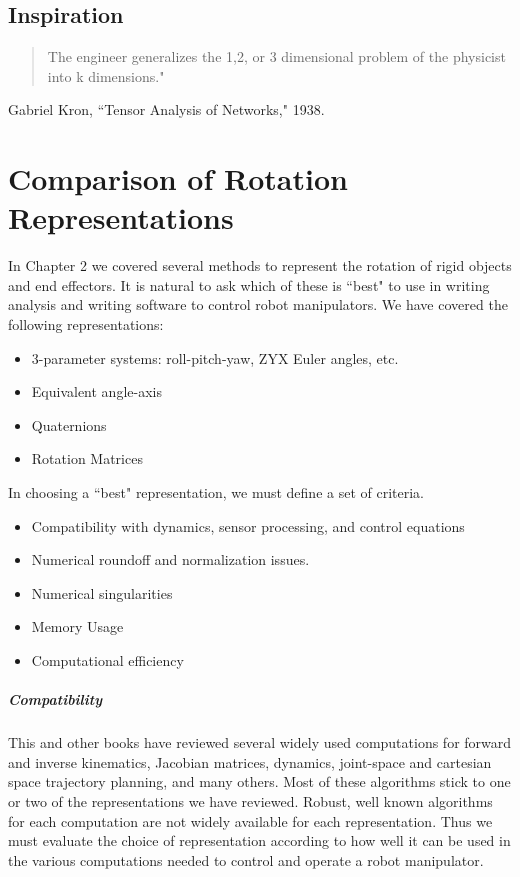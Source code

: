 \newpage

\section{Inspiration}
\begin{quotation}
The engineer generalizes the 1,2, or 3 dimensional problem of the physicist into k dimensions."
\end{quotation}
Gabriel Kron, ``Tensor Analysis of Networks," 1938.







\newpage
\chapter{Comparison of Rotation Representations}

In Chapter 2 we covered several methods to represent the rotation of rigid objects and end  effectors.  It is natural to ask which of these is ``best" to use in writing analysis and writing software to control robot manipulators.  We have covered the following representations:

\begin{itemize}
  \item 3-parameter systems:  roll-pitch-yaw,  ZYX Euler angles,  etc.
  \item Equivalent angle-axis
  \item Quaternions
  \item Rotation Matrices
\end{itemize}

In choosing a ``best" representation, we must define a set of criteria.


\begin{itemize}
  \item Compatibility with dynamics, sensor processing, and control equations
  \item Numerical roundoff and normalization issues.
  \item Numerical singularities
  \item Memory Usage
  \item Computational efficiency
\end{itemize}

\paragraph{Compatibility}
This and other books have reviewed several widely used computations for forward and inverse kinematics, Jacobian matrices, dynamics, joint-space and cartesian space trajectory planning, and many others.   Most of these algorithms stick to one or two of the representations we have reviewed.   Robust, well known algorithms for each computation are not widely available for each representation.  Thus we must evaluate the choice of representation according to how well it can be used in the various computations needed to control and operate a robot manipulator.

